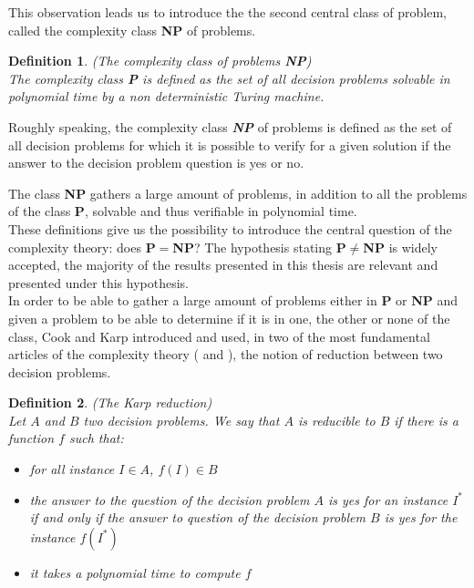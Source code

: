 \documentclass[a4paper]{book}
\newtheorem{definition}{Definition}
\begin{document}
This observation leads us to introduce the the second central class of problem, called the complexity class \textbf{NP} of problems.
\begin{definition}{\emph{(The complexity class of problems \textbf{NP})}} \\
The complexity class \emph{\textbf{P}} is defined as the set of all decision problems solvable in polynomial time by a non deterministic Turing machine.
\end{definition}

Roughly speaking, the complexity class \emph{\textbf{NP}} of problems is defined as the set of all decision problems for which it is possible to verify for a given solution if the answer to the decision problem question is yes or no.


The class \textbf{NP} gathers a large amount of problems, in addition to all the problems of the class \textbf{P}, solvable and thus verifiable in polynomial time. \\
These definitions give us the possibility to introduce the central question of the complexity theory: does \textbf{P}$=$\textbf{NP}? The hypothesis stating \textbf{P}$\ne$\textbf{NP} is widely accepted, the majority of the results presented in this thesis are relevant and presented under this hypothesis. \\
In order to be able to gather a large amount of problems either in \textbf{P} or \textbf{NP} and given a problem to be able to determine if it is in one, the other or none of the class, Cook and Karp introduced and used, in two of the most fundamental articles of the complexity theory (\cite{Cook71} and \cite{Karp72}), the notion of reduction between two decision problems.

\begin{definition}{\emph{(The Karp reduction)}} \label{def:karpreduc}\\
Let $A$ and $B$ two decision problems. We say that $A$ is reducible to $B$ if there is a function $f$ such that:
\begin{itemize}
    \item for all instance $I \in A$, $f(I)\in B$
    \item the answer to the question of the decision problem $A$ is yes for an instance $I^*$ if and only if the answer to question of the decision problem $B$ is yes for the instance $f(I^*)$
    \item it takes a polynomial time to compute $f$ 
\end{itemize}
\end{definition}
\end{document}
